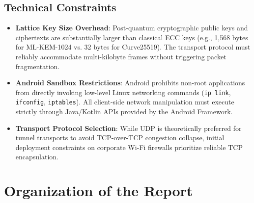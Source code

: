 \subsection{Technical Constraints}
\begin{itemize}
    \item \textbf{Lattice Key Size Overhead}: Post-quantum cryptographic public keys and ciphertexts are substantially larger than classical ECC keys (e.g., 1,568 bytes for ML-KEM-1024 vs. 32 bytes for Curve25519). The transport protocol must reliably accommodate multi-kilobyte frames without triggering packet fragmentation.
    \item \textbf{Android Sandbox Restrictions}: Android prohibits non-root applications from directly invoking low-level Linux networking commands (\texttt{ip link}, \texttt{ifconfig}, \texttt{iptables}). All client-side network manipulation must execute strictly through Java/Kotlin APIs provided by the Android Framework.
    \item \textbf{Transport Protocol Selection}: While UDP is theoretically preferred for tunnel transports to avoid TCP-over-TCP congestion collapse, initial deployment constraints on corporate Wi-Fi firewalls prioritize reliable TCP encapsulation.
\end{itemize}

\section{Organization of the Report}
\label{sec:report_organization}

